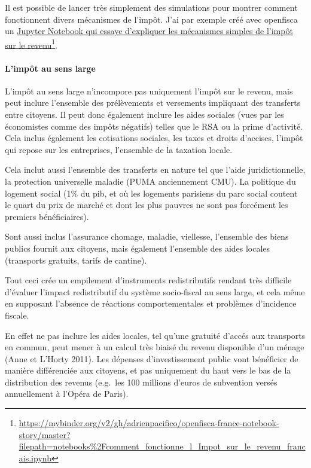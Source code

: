 Il est possible de lancer très simplement des simulations pour montrer
comment fonctionnent divers mécanismes de l'impôt. J'ai par exemple créé
avec openfisca un
\href{https://mybinder.org/v2/gh/adrienpacifico/openfisca-france-notebook-story/master?filepath=notebooks\%2Fcomment_fonctionne_l_Impot_sur_le_revenu_francais.ipynb}{Jupyter
Notebook qui essaye d'expliquer les mécanismes simples de l'impôt sur le
revenu}\footnote{\url{https://mybinder.org/v2/gh/adrienpacifico/openfisca-france-notebook-story/master?filepath=notebooks\%2Fcomment_fonctionne_l_Impot_sur_le_revenu_francais.ipynb}}.


\paragraph{L'impôt au sens large}

L'impôt au sens large n'incompore pas uniquement l'impôt sur le revenu,
mais peut inclure l'ensemble des prélèvements et versements impliquant
des transferts entre citoyens. Il peut donc également inclure les aides
sociales (vues par les économistes comme des impôts négatifs) telles que
le RSA ou la prime d'activité. Cela inclus également les cotisations
sociales, les taxes et droits d'accises, l'impôt qui repose sur les
entreprises, l'ensemble de la taxation locale.

Cela inclut aussi l'ensemble des transferts en nature tel que l'aide
juridictionnelle, la protection universelle maladie (PUMA anciennement
CMU). La politique du logement social (1\% du pib, et où les logements
parisiens du parc social coutent le quart du prix de marché et dont les
plus pauvres ne sont pas forcément les premiers bénéficiaires).

Sont aussi inclus l'assurance chomage, maladie, viellesse, l'ensemble
des biens publics fournit aux citoyens, mais également l'ensemble des
aides locales (transports gratuits, tarifs de cantine).

Tout ceci crée un empilement d'instruments redistributifs rendant très
difficile d'évaluer l'impact redistributif du système socio-fiscal au
sens large, et cela même en supposant l'absence de réactions
comportementales et problèmes d'incidence fiscale.

En effet ne pas inclure les aides locales, tel qu'une gratuité d'accés
aux transports en commun, peut mener à un calcul très biaisé du revenu
disponible d'un ménage (Anne et L'Horty 2011). Les dépenses
d'investissement public vont bénéficier de manière différenciée aux
citoyens, et pas uniquement du haut vers le bas de la distribution des
revenus (e.g.~les 100 millions d'euros de subvention versés annuellement
à l'Opéra de Paris).

